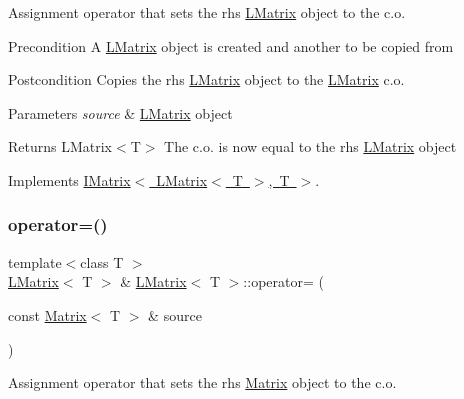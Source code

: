 Assignment operator that sets the rhs \mbox{\hyperlink{class_l_matrix}{L\+Matrix}} object to the c.\+o. 

\begin{DoxyPrecond}{Precondition}
A \mbox{\hyperlink{class_l_matrix}{L\+Matrix}} object is created and another to be copied from 
\end{DoxyPrecond}
\begin{DoxyPostcond}{Postcondition}
Copies the rhs \mbox{\hyperlink{class_l_matrix}{L\+Matrix}} object to the \mbox{\hyperlink{class_l_matrix}{L\+Matrix}} c.\+o. 
\end{DoxyPostcond}

\begin{DoxyParams}{Parameters}
{\em source} & \mbox{\hyperlink{class_l_matrix}{L\+Matrix}} object \\
\hline
\end{DoxyParams}
\begin{DoxyReturn}{Returns}
L\+Matrix$<$\+T$>$ The c.\+o. is now equal to the rhs \mbox{\hyperlink{class_l_matrix}{L\+Matrix}} object 
\end{DoxyReturn}


Implements \mbox{\hyperlink{class_i_matrix_a9eeb68de7e1d37d1aab439c78fea9be3}{I\+Matrix$<$ L\+Matrix$<$ T $>$, T $>$}}.

\mbox{\label{class_l_matrix_a4417a98f81bcd9797241cf658b8ba400}} 
\subsubsection{\texorpdfstring{operator=()}{operator=()}\hspace{0.1cm}{\footnotesize\ttfamily [2/2]}}
{\footnotesize\ttfamily template$<$class T $>$ \\
\mbox{\hyperlink{class_l_matrix}{L\+Matrix}}$<$ T $>$ \& \mbox{\hyperlink{class_l_matrix}{L\+Matrix}}$<$ T $>$\+::operator= (\begin{DoxyParamCaption}\item[{const \mbox{\hyperlink{class_matrix}{Matrix}}$<$ T $>$ \&}]{source }\end{DoxyParamCaption})}



Assignment operator that sets the rhs \mbox{\hyperlink{class_matrix}{Matrix}} object to the c.\+o. 

